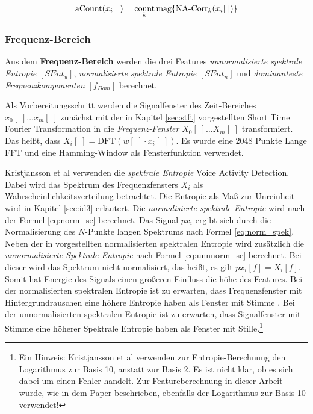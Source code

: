 \begin{equation}
\text{aCount}(x_i[\;]) = \operatorname*{count}_{k}\text{mag}\{\text{NA-Corr}_k(x_i[\;])\}
\label{eq:corrcount}
\end{equation}



\subsubsection{Frequenz-Bereich}

Aus dem \textbf{Frequenz-Bereich} werden die drei Features \emph{unnormalisierte spektrale Entropie} $[SEnt_{u}]$, \emph{normalisierte spektrale Entropie}  $[SEnt_{n}]$ und \emph{dominanteste Frequenzkomponenten} $[f_{Dom}]$ berechnet. 

Als Vorbereitungsschritt werden die Signalfenster des Zeit-Bereiches $x_0[\;] \ldots x_m[\;]$ zunächst mit der in Kapitel \ref{sec:stft} vorgestellten Short Time Fourier Transformation in die \emph{Frequenz-Fenster} \label{eq:stft} $X_0[\;] \ldots X_m[\;]$ transformiert. Das heißt, dass $X_i[\;] = \text{DFT}(w[\;] \cdot x_i[\;])$. Es wurde eine $2048$ Punkte Lange FFT und eine Hamming-Window als Fensterfunktion verwendet.

Kristjansson et al \cite[S. 2]{vad_Lisboa} verwenden die \emph{spektrale Entropie} Voice Activity Detection. Dabei wird das Spektrum des Frequenzfensters $X_i$ als Wahrscheinlichkeitsverteilung betrachtet. Die Entropie als Maß zur \glqq Unreinheit\grqq{} wird in Kapitel \ref{sec:id3} erläutert. Die \emph{normalisierte spektrale Entropie} wird nach der Formel \ref{eq:norm_se} berechnet. Das Signal $px_i$ ergibt sich durch die Normalisierung des $N$-Punkte langen Spektrums nach Formel \ref{eq:norm_spek}. Neben der in \cite{vad_Lisboa} vorgestellten normalisierten spektralen Entropie wird zusätzlich die \emph{unnormalisierte Spektrale Entropie} nach Formel \ref{eq:unnnorm_se} berechnet. Bei dieser wird das Spektrum nicht normalisiert, das heißt, es gilt $px_i[f] = X_i[f]$. Somit hat Energie des Signals einen größeren Einfluss die höhe des Features. Bei der normalisierten spektralen Entropie ist zu erwarten, dass Frequenzfenster mit Hintergrundrauschen eine höhere Entropie haben als Fenster mit Stimme . Bei der unnormalisierten spektralen Entropie ist zu erwarten, dass Signalfenster mit Stimme eine höherer Spektrale Entropie haben als Fenster mit Stille.\footnote{Ein Hinweis: Kristjansson et al \cite[S. 2]{vad_Lisboa} verwenden zur Entropie-Berechnung den Logarithmus zur Basis 10, anstatt zur Basis 2. Es ist nicht klar, ob es sich dabei um einen Fehler handelt. Zur Featureberechnung in dieser Arbeit wurde, wie in dem Paper beschrieben, ebenfalls der Logarithmus zur Basis 10 verwendet!}

